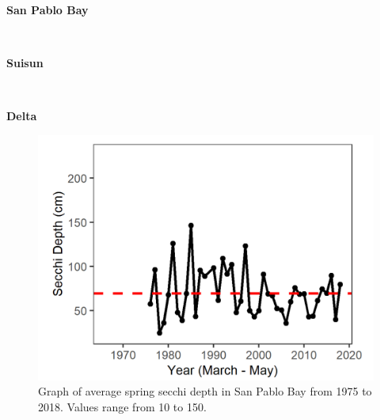 \documentclass[
]{book}
\begin{document}
\begin{panel-grid}

\begin{columns-nocenter}

\begin{column800}

\textbf{San Pablo Bay}

\end{column800}

\begin{column40}

~

\end{column40}

\begin{column800}

\textbf{Suisun}

\end{column800}

\begin{column40}

~

\end{column40}

\begin{column800}

\textbf{Delta}

\end{column800}

\end{columns-nocenter}

\begin{columns-nocenter}

\begin{column800}

\begin{expand}

\begin{figure}
\includegraphics[width=15.25in]{figures/secchi_splspring} \caption{Graph of average spring secchi depth in San Pablo Bay from 1975 to 2018. Values range from 10 to 150.}\label{fig:unnamed-chunk-8}
\end{figure}


\end{expand}
\end{column800}
\end{columns-nocenter}
\end{panel-grid}
\end{document}
